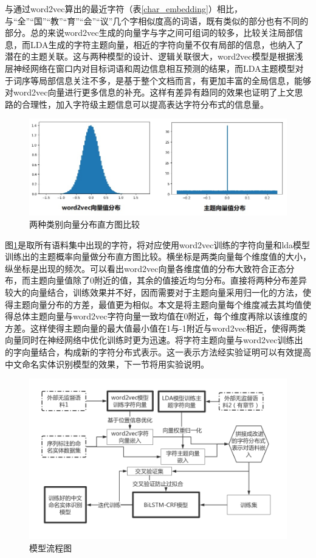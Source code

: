 \documentclass[winfonts,master,oneside,nobackinfo]{njuthesis}
\begin{document}
与通过word2vec算出的最近字符（表\ref{char_embedding}）相比，与“全”“国”“教”“育”“会”“议”几个字相似度高的词语，既有类似的部分也有不同的部分。总的来说word2vec生成的向量字与字之间可组词的较多，比较关注局部信息，而LDA生成的字符主题向量，相近的字符向量不仅有局部的信息，也纳入了潜在的主题关联。这与两种模型的设计、逻辑关联很大，word2vec模型是根据浅层神经网络在窗口内对目标词语和周边信息相互预测的结果，而LDA主题模型对于词序等局部信息关注不多，是基于整个文档而言，有更加丰富的全局信息，能够对word2vec向量进行更多信息的补充。这样有差异有趋同的效果也证明了上文思路的合理性，加入字符级主题信息可以提高表达字符分布式的信息量。

\begin{figure}[H]
\centering
\includegraphics[width=1\textwidth]{./figure/分布.jpg}
\caption{两种类别向量分布直方图比较}
\label{two-distribution}
\end{figure}

图\ref{two-distribution}是取所有语料集中出现的字符，将对应使用word2vec训练的字符向量和lda模型训练出的主题概率向量做分布直方图比较。横坐标是两类向量每个维度值的大小，纵坐标是出现的频次。可以看出word2vec向量各维度值的分布大致符合正态分布，而主题向量值除了0附近的值，其余的值接近均匀分布。直接将两种分布差异较大的向量结合，训练效果并不好，因而需要对于主题向量采用归一化的方法，使得主题向量分布的方差，最值更为相似。本文是将主题向量每个维度减去其均值使得总体主题向量与word2vec字符向量一致均值在0附近，每个维度再除以该维度的方差。这样使得主题向量的最大值最小值在1与-1附近与word2vec相近，使得两类向量同时在神经网络中优化训练时更为迅速。将字符主题向量与word2vec训练出的字向量结合，构成新的字符分布式表示。这一表示方法经实验证明可以有效提高中文命名实体识别模型的效果，下一节将用实验说明。

\begin{figure}[h]
\centering
\includegraphics[width=1\textwidth]{./figure/改进的字符分布式表示.jpg}
\caption{模型流程图}
\label{all-step}
\end{figure}
\end{document}
